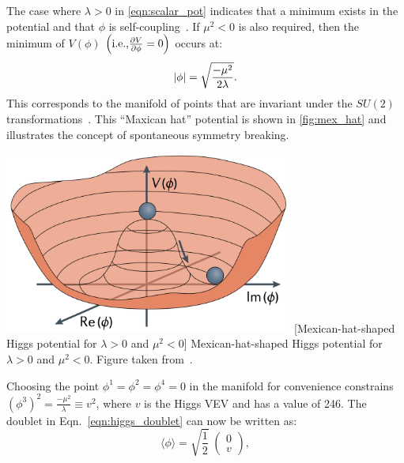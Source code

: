 The case where $\lambda > 0$ in \cref{eqn:scalar_pot} indicates that a minimum exists in the potential and that $\phi$ is self-coupling~\cite{bass_higgs_2021}.
If $\mu^2 < 0$ is also required, then the minimum of $V(\phi)$ $\left( \mbox{i.e.,} \frac{\partial V}{\partial \phi} = 0 \right)$ occurs at:
\begin{equation}
    \lvert \phi \rvert = \sqrt{ \frac{-\mu^2}{2\lambda} }.
    \label{eqn:higgs_min}
\end{equation}
This corresponds to the manifold of points that are invariant under the $SU(2)$ transformations~\cite{Halzen:1984mc}.
This ``Maxican hat'' potential is shown in \cref{fig:mex_hat} and illustrates the concept of spontaneous symmetry breaking.
\begin{multiFigure}
    \centering
        \includegraphics[height=6cm,keepaspectratio]{figures/sm/higgs_potential.png}
        [Mexican-hat-shaped Higgs potential for $\lambda > 0$ and $\mu^2 < 0$]
        {Mexican-hat-shaped Higgs potential for $\lambda > 0$ and $\mu^2 < 0$.
        Figure taken from~\cite{bass_higgs_2021}.} 
    \label{fig:mex_hat}
\end{multiFigure}
Choosing the point $\phi^1 = \phi^2 = \phi^4 = 0$ in the manifold for convenience constrains $\left(\phi^3\right)^2 = \frac{-\mu^2}{\lambda} \equiv v^2$,
where $v$ is the Higgs VEV and has a value of 246\GeV.
The doublet in Eqn.~\ref{eqn:higgs_doublet} can now be written as:
\begin{equation*}
    \langle\phi\rangle = \sqrt{\frac{1}{2}}
    \hspace{3pt}
    \begin{pmatrix}
        0 
        \\
        v 
    \end{pmatrix},
\end{equation*}
